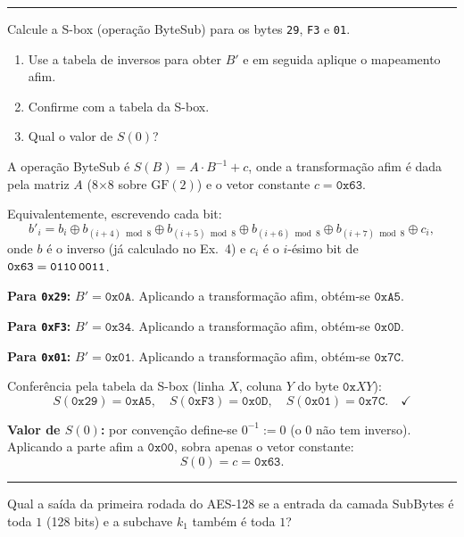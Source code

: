 \documentclass[12pt,a4paper]{article}
\newcommand{\exercicio}[1]{%
    \par\vspace{1.2em}
    \noindent
    {\color{black!55}\rule[-0.25em]{3pt}{1.6em}}%
    \hspace{0.6em}{\Large\bfseries Exerc\'{i}cio #1}
    \par\vspace{-0.4em}
    \noindent{\color{black!35}\rule{\textwidth}{0.4pt}}
    \par\vspace{0.35em}
}
\newenvironment{resposta}{%
    \begin{respostabox}
    \color{red!70!black}\sloppy
}{%
    \end{respostabox}
}
\begin{document}
\exercicio{5}
Calcule a S-box (operação ByteSub) para os bytes \texttt{29}, \texttt{F3} e \texttt{01}.

\begin{enumerate}[label=\arabic*.]
    \item Use a tabela de inversos para obter $B'$ e em seguida aplique o mapeamento afim.
    \item Confirme com a tabela da S-box.
    \item Qual o valor de $S(0)$?
\end{enumerate}

\begin{resposta}

A operação ByteSub é $S(B) = A \cdot B^{-1} + c$, onde a transformação afim é dada pela matriz $A$ (8$\times$8 sobre $\mathrm{GF}(2)$) e o vetor constante $c = \texttt{0x63}$.

Equivalentemente, escrevendo cada bit:
\[
b'_i = b_i \oplus b_{(i+4)\bmod 8} \oplus b_{(i+5)\bmod 8} \oplus b_{(i+6)\bmod 8} \oplus b_{(i+7)\bmod 8} \oplus c_i,
\]
onde $b$ é o inverso (já calculado no Ex.\ 4) e $c_i$ é o $i$-ésimo bit de $\texttt{0x63} = \texttt{0110\,0011}$.

\textbf{Para \texttt{0x29}:} $B' = \texttt{0x0A}$. Aplicando a transformação afim, obtém-se $\texttt{0xA5}$.

\textbf{Para \texttt{0xF3}:} $B' = \texttt{0x34}$. Aplicando a transformação afim, obtém-se $\texttt{0x0D}$.

\textbf{Para \texttt{0x01}:} $B' = \texttt{0x01}$. Aplicando a transformação afim, obtém-se $\texttt{0x7C}$.

Conferência pela tabela da S-box (linha $X$, coluna $Y$ do byte $\texttt{0x}XY$):
\[
S(\texttt{0x29}) = \texttt{0xA5}, \quad S(\texttt{0xF3}) = \texttt{0x0D}, \quad S(\texttt{0x01}) = \texttt{0x7C}. \quad \checkmark
\]

\textbf{Valor de $S(0)$:} por convenção define-se $0^{-1} := 0$ (o $0$ não tem inverso). Aplicando a parte afim a $\texttt{0x00}$, sobra apenas o vetor constante:
\[
S(0) = c = \texttt{0x63}.
\]

\end{resposta}

\exercicio{6}
Qual a saída da primeira rodada do AES-128 se a entrada da camada SubBytes é toda $1$ (128 bits) e a subchave $k_1$ também é toda $1$?
\end{document}
